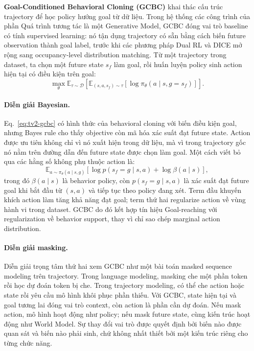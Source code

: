 \textbf{Goal-Conditioned Behavioral Cloning (GCBC)} khai thác cấu trúc trajectory để học policy hướng goal từ dữ liệu.
Trong hệ thống các công trình của phần Quá trình tương tác là một Generative Model, GCBC đóng vai trò baseline có tính supervised learning: nó tận dụng trajectory có sẵn bằng cách biến future observation thành goal label, trước khi các phương pháp Dual RL và DICE mở rộng sang occupancy-level distribution matching.
Từ một trajectory trong dataset, ta chọn một future state $s_f$ làm goal, rồi huấn luyện policy sinh action hiện tại có điều kiện trên goal:
\begin{equation}
    \max_\theta
    \mathbb{E}_{\tau\sim\mathcal{D}}
    \left[
        \mathbb{E}_{(s,a,s_f)\sim\tau}
        \left[
            \log \pi_\theta(a\mid s,g=s_f)
        \right]
    \right].
    \label{eq:tv2-gcbc}
\end{equation}
\paragraph{Diễn giải Bayesian.}
Eq.~\eqref{eq:tv2-gcbc} có hình thức của behavioral cloning với biến điều kiện goal, nhưng Bayes rule cho thấy objective còn mã hóa xác suất đạt future state.
Action được ưu tiên không chỉ vì nó xuất hiện trong dữ liệu, mà vì trong trajectory gốc nó nằm trên đường dẫn đến future state được chọn làm goal.
Một cách viết bỏ qua các hằng số không phụ thuộc action là:
\begin{equation}
    \mathbb{E}_{a\sim\pi_\theta(a\mid s,g)}
    \left[
        \log p(s_f=g\mid s,a)
        +
        \log \beta(a\mid s)
    \right],
    \label{eq:tv2-gcbc-bayes}
\end{equation}
trong đó $\beta(a\mid s)$ là behavior policy, còn $p(s_f=g\mid s,a)$ là xác suất đạt future goal khi bắt đầu từ $(s,a)$ và tiếp tục theo policy đang xét.
Term đầu khuyến khích action làm tăng khả năng đạt goal; term thứ hai regularize action về vùng hành vi trong dataset.
GCBC do đó kết hợp tín hiệu Goal-reaching với regularization về behavior support, thay vì chỉ sao chép marginal action distribution.

\paragraph{Diễn giải masking.}
Diễn giải trọng tâm thứ hai xem GCBC như một bài toán masked sequence modeling trên trajectory.
Trong language modeling, masking che một phần token rồi học dự đoán token bị che.
Trong trajectory modeling, có thể che action hoặc state rồi yêu cầu mô hình khôi phục phần thiếu.
Với GCBC, state hiện tại và goal tương lai đóng vai trò context, còn action là phần cần dự đoán.
Nếu mask action, mô hình hoạt động như policy; nếu mask future state, cùng kiến trúc hoạt động như World Model.
Sự thay đổi vai trò được quyết định bởi biến nào được quan sát và biến nào phải sinh, chứ không nhất thiết bởi một kiến trúc riêng cho từng chức năng.

